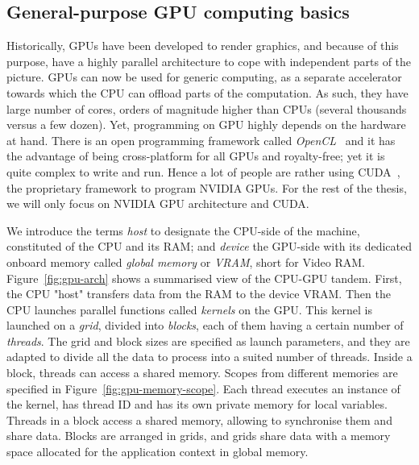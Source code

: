\subsection{General-purpose GPU computing basics}

Historically, GPUs have been developed to render graphics, and because of this purpose, have a highly parallel architecture to cope with independent parts of the picture. GPUs can now be used for generic computing, as a separate accelerator towards which the CPU can offload parts of the computation. As such, they have large number of cores, orders of magnitude higher than CPUs (several thousands versus a few dozen). Yet, programming on GPU highly depends on the hardware at hand. There is an open programming framework called \emph{OpenCL}~\cite{misc:opencl} and it has the advantage of being cross-platform for all GPUs and royalty-free; yet it is quite complex to write and run. Hence a lot of people are rather using CUDA~\cite{misc:cuda}, the proprietary framework to program NVIDIA GPUs. For the rest of the thesis, we will only focus on NVIDIA GPU architecture and CUDA.

We introduce the terms \emph{host} to designate the CPU-side of the machine, constituted of the CPU and its RAM; and \emph{device} the GPU-side with its dedicated onboard memory called \emph{global memory} or \emph{VRAM}, short for Video RAM. Figure~\ref{fig:gpu-arch} shows a summarised view of the CPU-GPU tandem. First, the CPU "host" transfers data from the RAM to the device VRAM. Then the CPU launches parallel functions called \emph{kernels} on the GPU. This kernel is launched on a \emph{grid}, divided into \emph{blocks}, each of them having a certain number of \emph{threads}. The grid and block sizes are specified as launch parameters, and they are adapted to divide all the data to process into a suited number of threads. Inside a block, threads can access a shared memory. Scopes from different memories are specified in Figure~\ref{fig:gpu-memory-scope}. Each thread executes an instance of the kernel, has thread ID and has its own private memory for local variables. Threads in a block access a shared memory, allowing to synchronise them and share data. Blocks are arranged in grids, and grids share data with a memory space allocated for the application context in global memory.

